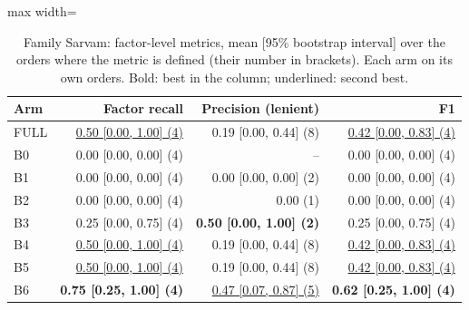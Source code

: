 \begin{table}[htbp]
\centering\footnotesize
\begin{adjustbox}{max width=\textwidth}
\begin{tabular}{@{}lrrr@{}}
\toprule
Arm & Factor recall & Precision (lenient) & F1 \\
\midrule
FULL & \underline{0.50 [0.00, 1.00] (4)} & 0.19 [0.00, 0.44] (8) & \underline{0.42 [0.00, 0.83] (4)} \\
B0 & 0.00 [0.00, 0.00] (4) & -- & 0.00 [0.00, 0.00] (4) \\
B1 & 0.00 [0.00, 0.00] (4) & 0.00 [0.00, 0.00] (2) & 0.00 [0.00, 0.00] (4) \\
B2 & 0.00 [0.00, 0.00] (4) & 0.00 (1) & 0.00 [0.00, 0.00] (4) \\
B3 & 0.25 [0.00, 0.75] (4) & \textbf{0.50 [0.00, 1.00] (2)} & 0.25 [0.00, 0.75] (4) \\
B4 & \underline{0.50 [0.00, 1.00] (4)} & 0.19 [0.00, 0.44] (8) & \underline{0.42 [0.00, 0.83] (4)} \\
B5 & \underline{0.50 [0.00, 1.00] (4)} & 0.19 [0.00, 0.44] (8) & \underline{0.42 [0.00, 0.83] (4)} \\
B6 & \textbf{0.75 [0.25, 1.00] (4)} & \underline{0.47 [0.07, 0.87] (5)} & \textbf{0.62 [0.25, 1.00] (4)} \\
\bottomrule
\end{tabular}
\end{adjustbox}
\caption{Family Sarvam: factor-level metrics, mean [95\% bootstrap interval] over the orders where the metric is defined (their number in brackets). Each arm on its own orders. Bold: best in the column; underlined: second best.}
\label{tab:table1a_sarvam}
\end{table}